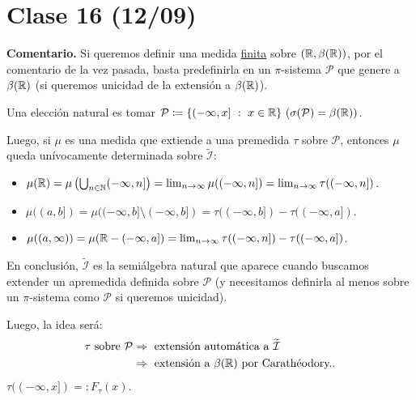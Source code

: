 \section{Clase 16 (12/09)}

\textbf{Comentario.} Si queremos definir una medida \underline{finita} sobre $(\mathbb{R},\beta(\mathbb{R}))$, por el comentario de la vez pasada, basta predefinirla en un $\pi$-sistema $\mathcal{P}$ que genere a $\beta(\mathbb{R})$ (si queremos unicidad de la extensión a $\beta(\mathbb{R})$). \par
\medskip
\noindent Una elección natural es tomar $\mathcal{P} \coloneq \{ (-\infty,x] \ : \ x \in \mathbb{R} \} \ (\sigma(\mathcal{P}) = \beta(\mathbb{R}))$. \par
\medskip
\noindent Luego, si $\mu$ es una medida que extiende a una premedida $\tau$ sobre $\mathcal{P}$, entonces $\mu$ queda unívocamente determinada sobre $\widetilde{\mathcal{I}}$:

\begin{itemize}
	\item $\mu(\mathbb{R}) = \mu\left( \bigcup_{n\in\mathbb{N}} (-\infty,n] \right) = \lim_{n \to \infty} \mu((-\infty,n]) = \lim_{n \to \infty} \tau((-\infty,n])$.

	\item $\mu((a,b]) = \mu((-\infty,b] \setminus (-\infty,b]) = \tau((-\infty,b]) - \tau((-\infty,a])$.

	\item $\mu((a,\infty)) = \mu(\mathbb{R}-(-\infty,a]) = \lim_{n \to \infty} \tau((-\infty,n]) - \tau((-\infty,a])$.
\end{itemize}

\noindent En conclusión, $\widetilde{\mathcal{I}}$ es la semiálgebra natural que aparece cuando buscamos extender un apremedida definida sobre $\mathcal{P}$ (y necesitamos definirla al menos sobre un $\pi$-sistema como $\mathcal{P}$ si queremos unicidad). \par
\medskip
\noindent Luego, la idea será:
\begin{align*}
	\tau \text{ sobre } \mathcal{P} &\Rightarrow \text{ extensión automática a } \widetilde{\mathcal{I}} \\
	&\Rightarrow \text{ extensión a } \beta(\mathbb{R}) \text{ por Carathéodory.}
.\end{align*}
$\tau((-\infty,x]) =: F_{\tau}(x)$.

